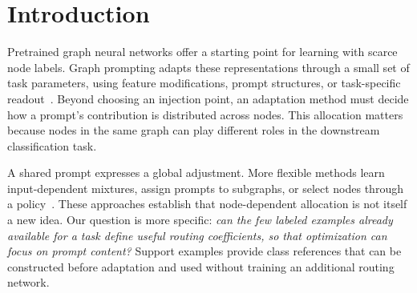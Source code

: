 \begin{abstract}
We introduce \method, a graph prompting method that uses support-set prototypes to route trainable prompts to individual nodes. With only a few labeled nodes per class, adaptation must determine both what a prompt should encode and where its contribution should be applied. \method{} constructs class references from aggregated node attributes, refines them using unlabeled graph features while retaining support anchors, and converts node--prototype associations into a fixed routing matrix. The resulting combinations of class prompt tokens are injected into a frozen graph convolutional encoder, followed by prototype classification. We evaluate each 1-, 3-, and 5-shot setting separately on Cora, CiteSeer, and PubMed using the original ProG sampler, which can overlap support and test nodes, with matched task draws and training seeds. In the 5-shot setting, \method{} achieves accuracies of 72.87\%, 64.70\%, and 68.34\%, respectively; replacing a shared prompt with prototype routing improves accuracy by 36.57, 39.09, and 3.34 percentage points in the corresponding conditions. These paired results support the value of prototype-guided prompt allocation within this overlapping transductive evaluation protocol.
\end{abstract}

\section{Introduction}
Pretrained graph neural networks offer a starting point for learning with scarce node labels. Graph prompting adapts these representations through a small set of task parameters, using feature modifications, prompt structures, or task-specific readout~\citep{gppt2022,gpf2023,allinone2023,graphprompt2023}. Beyond choosing an injection point, an adaptation method must decide how a prompt's contribution is distributed across nodes. This allocation matters because nodes in the same graph can play different roles in the downstream classification task.

A shared prompt expresses a global adjustment. More flexible methods learn input-dependent mixtures, assign prompts to subgraphs, or select nodes through a policy~\citep{gpf2023,supt2026,relief2025}. These approaches establish that node-dependent allocation is not itself a new idea. Our question is more specific: \emph{can the few labeled examples already available for a task define useful routing coefficients, so that optimization can focus on prompt content?} Support examples provide class references that can be constructed before adaptation and used without training an additional routing network.

